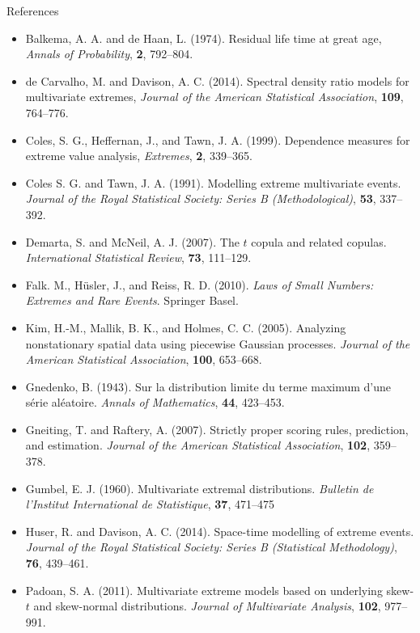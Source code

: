 \documentclass{beamer}
\begin{document}
\begin{frame}[allowframebreaks]{References}
  \begin{itemize} \setlength{\itemsep}{1em}
    \item Balkema, A. A. and de Haan, L. (1974). Residual life time at great age, {\it Annals of Probability}, {\bf 2}, 792--804.
    \item de Carvalho, M. and Davison, A. C. (2014). Spectral density ratio models for multivariate extremes, {\it Journal of the American Statistical Association}, {\bf 109}, 764--776.
    \item Coles, S. G., Heffernan, J., and Tawn, J. A. (1999). Dependence measures for extreme value analysis, {\it Extremes}, {\bf 2}, 339--365.
    \item Coles S. G. and Tawn, J. A. (1991). Modelling extreme multivariate events. {\it Journal of the Royal Statistical Society: Series B (Methodological)}, {\bf 53}, 337--392.
    \item Demarta, S. and McNeil, A. J. (2007). The $t$ copula and related copulas. {\it International Statistical Review}, {\bf 73}, 111--129.
    \item Falk. M., H\"{u}sler, J., and Reiss, R. D. (2010). {\it Laws of Small Numbers: Extremes and Rare Events}. Springer Basel.
    \item Kim, H.-M., Mallik, B. K., and Holmes, C. C. (2005). Analyzing nonstationary spatial data using piecewise Gaussian processes. {\it Journal of the American Statistical Association}, {\bf 100}, 653--668.
    \item Gnedenko, B. (1943). Sur la distribution limite du terme maximum d'une s\'{e}rie al\'{e}atoire. {\it Annals of Mathematics}, {\bf 44}, 423--453.
    \item Gneiting, T. and Raftery, A. (2007). Strictly proper scoring rules, prediction, and estimation. {\it Journal of the American Statistical Association}, {\bf 102}, 359--378.
    \item Gumbel, E. J. (1960). Multivariate extremal distributions. {\it Bulletin de l'Institut International de Statistique}, {\bf 37}, 471--475
    \item Huser, R. and Davison, A. C. (2014). Space-time modelling of extreme events. {\it Journal of the Royal Statistical Society: Series B (Statistical Methodology)}, {\bf 76}, 439--461.
    \item Padoan, S. A. (2011). Multivariate extreme models based on underlying skew-$t$ and skew-normal distributions. {\it Journal of Multivariate Analysis}, {\bf 102}, 977--991.

\end{itemize}
\end{frame}
\end{document}
